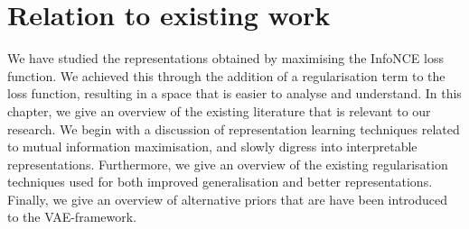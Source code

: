 
\chapter{Relation to existing work}

We have studied the representations obtained by maximising the InfoNCE loss function. We achieved this through the addition of a regularisation term to the loss function, resulting in a space that is easier to analyse and understand. In this chapter, we give an overview of the existing literature that is relevant to our research. We begin with a discussion of representation learning techniques related to mutual information maximisation, and slowly digress into interpretable representations. Furthermore, we give an overview of the existing regularisation techniques used for both improved generalisation and better representations. Finally, we give an overview of alternative priors that are have been introduced to the VAE-framework.


